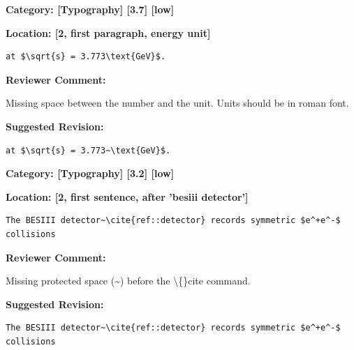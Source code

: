\documentclass[12pt]{article}
\begin{document}
\begin{reviewer}
\noindent \textbf{Category: [Typography] [3.7] [low]}

\noindent \textbf{Location: [2, first paragraph, energy unit]}

\begin{lstlisting}[breaklines=true]
	at $\sqrt{s} = 3.773\text{GeV}$.
\end{lstlisting}

\textbf{Reviewer Comment:}

Missing space between the number and the unit. Units should be in roman font.

\textbf{Suggested Revision:}

\begin{lstlisting}[breaklines=true]
	at $\sqrt{s} = 3.773~\text{GeV}$.
\end{lstlisting}

\end{reviewer}

\begin{reviewer}
\noindent \textbf{Category: [Typography] [3.2] [low]}

\noindent \textbf{Location: [2, first sentence, after 'besiii detector']}

\begin{lstlisting}[breaklines=true]
	The BESIII detector~\cite{ref::detector} records symmetric $e^+e^-$ collisions
\end{lstlisting}

\textbf{Reviewer Comment:}

Missing protected space (\textasciitilde{}) before the \textbackslash\{\}cite command.

\textbf{Suggested Revision:}

\begin{lstlisting}[breaklines=true]
	The BESIII detector~\cite{ref::detector} records symmetric $e^+e^-$ collisions
\end{lstlisting}

\end{reviewer}
\end{document}

